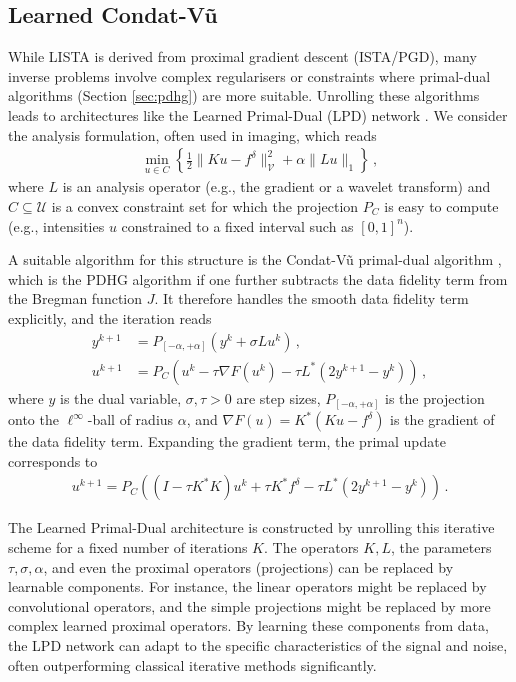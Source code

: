 \subsection{Learned Condat-V\~u}

While LISTA is derived from proximal gradient descent (ISTA/PGD), many inverse problems involve complex regularisers or constraints where primal-dual algorithms (Section \ref{sec:pdhg}) are more suitable. Unrolling these algorithms leads to architectures like the Learned Primal-Dual (LPD) network \cite{adler2018learned}. We consider the analysis formulation, often used in imaging, which reads
\begin{align}
\min_{u \in C} \left\{ \frac12 \|K u - f^\delta\|_{\mathcal{V}}^2 + \alpha \|L u\|_1 \right\} \, ,\label{eq:analysis_formulation}
\end{align}
where $L$ is an analysis operator (e.g., the gradient or a wavelet transform) and $C \subseteq \mathcal{U}$ is a convex constraint set for which the projection $P_C$ is easy to compute (e.g., intensities $u$ constrained to a fixed interval such as $[0, 1]^n$).

A suitable algorithm for this structure is the Condat-V\~u primal-dual algorithm \cite{condat2013primal, vu2013splitting}, which is the PDHG algorithm if one further subtracts the data fidelity term from the Bregman function $J$. It therefore handles the smooth data fidelity term explicitly, and the iteration reads
\begin{subequations}\label{algo:pdcv}
\begin{align}
y^{k+1} &= P_{[-\alpha,+\alpha]}(y^k + \sigma L u^k) \, , \\
u^{k+1} &= P_C\left(u^k - \tau \nabla F(u^k) - \tau L^* (2 y^{k+1} - y^k)\right) \, ,
\end{align}
\end{subequations}
where $y$ is the dual variable, $\sigma, \tau > 0$ are step sizes, $P_{[-\alpha,+\alpha]}$ is the projection onto the $\ell^\infty$-ball of radius $\alpha$, and $\nabla F(u) = K^*(Ku - f^\delta)$ is the gradient of the data fidelity term. Expanding the gradient term, the primal update corresponds to
\begin{align*}
u^{k+1} = P_C \left( (I - \tau K^* K)u^k + \tau K^* f^\delta - \tau L^* (2 y^{k+1} - y^k) \right) \, .
\end{align*}

The Learned Primal-Dual architecture \cite{adler2018learned, jiu2021deep} is constructed by unrolling this iterative scheme for a fixed number of iterations $K$. The operators $K, L$, the parameters $\tau, \sigma, \alpha$, and even the proximal operators (projections) can be replaced by learnable components. For instance, the linear operators might be replaced by convolutional operators, and the simple projections might be replaced by more complex learned proximal operators. By learning these components from data, the LPD network can adapt to the specific characteristics of the signal and noise, often outperforming classical iterative methods significantly.

